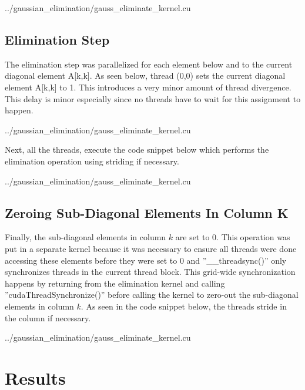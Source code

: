 \documentclass[12pt]{article}
\begin{document}
\vspace{0.25cm}

{../gaussian_elimination/gauss_eliminate_kernel.cu }

\pagebreak
\subsection{Elimination Step}

The elimination step was parallelized for each element below
and to the current diagonal element A[k,k].
As seen below, thread (0,0) sets the current diagonal element 
A[k,k] to 1. This introduces a very minor amount of thread divergence.
This delay is minor especially since no threads have to wait
for this assignment to happen.

\vspace{0.25cm}

{../gaussian_elimination/gauss_eliminate_kernel.cu }

Next, all the threads, execute the code snippet below
which performs the elimination operation using striding if necessary.

\vspace{0.25cm}

{../gaussian_elimination/gauss_eliminate_kernel.cu }

\pagebreak
\subsection{Zeroing Sub-Diagonal Elements In Column K}

Finally, the sub-diagonal elements in column $k$ are set to $0$.
This operation was put in a separate kernel because it was necessary
to ensure all threads were done accessing these elements before they
were set to $0$ and ''\_\_threadsync()'' only synchronizes threads in
the current thread block. This grid-wide synchronization happens
by returning from the elimination kernel and calling 
''cudaThreadSynchronize()'' before calling the kernel to zero-out
the sub-diagonal elements in column $k$. As seen in the code 
snippet below, the threads stride in the column if necessary.

\vspace{0.25cm}

{../gaussian_elimination/gauss_eliminate_kernel.cu }


\pagebreak
\section{Results}
\vspace{-0.25cm}
\end{document}
